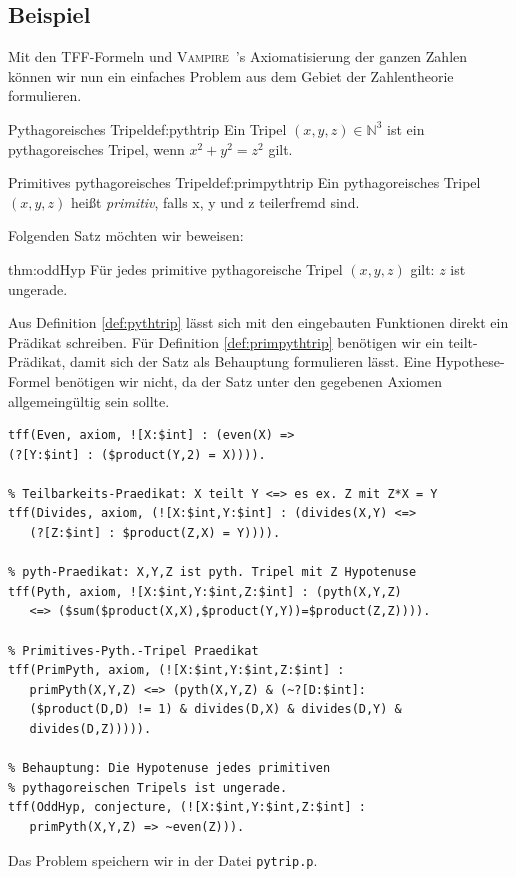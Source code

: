 \documentclass{article}
\newcommand{\vampire}{\textsc{Vampire}~}
\begin{document}
\fi %


\subsection{Beispiel}
\label{subsec:tptpexample}

Mit den TFF-Formeln und \vampire's Axiomatisierung der ganzen Zahlen können wir nun 
ein einfaches Problem aus dem Gebiet der Zahlentheorie formulieren.

\begin{definition}{Pythagoreisches Tripel}{def:pythtrip}
	Ein Tripel $(x, y, z) \in \mathds{N}^3$ ist ein pythagoreisches Tripel, wenn
	$x^2+y^2=z^2$ gilt.
\end{definition}
\begin{definition}{Primitives pythagoreisches Tripel}{def:primpythtrip}
	Ein pythagoreisches Tripel $(x, y, z)$ heißt \emph{primitiv}, falls x, y und z teilerfremd sind.
\end{definition}
Folgenden Satz möchten wir beweisen:
\begin{theorem}{}{thm:oddHyp}
	Für jedes primitive pythagoreische Tripel $(x, y, z)$ gilt: $z$ ist ungerade.
\end{theorem}
Aus Definition \ref{def:pythtrip} lässt sich mit den eingebauten Funktionen direkt ein Prädikat schreiben.
Für Definition \ref{def:primpythtrip} benötigen wir ein teilt-Prädikat, damit sich der Satz als Behauptung formulieren lässt. 
Eine Hypothese-Formel benötigen wir nicht, da der Satz unter den gegebenen Axiomen allgemeingültig sein sollte.
\begin{lstlisting}[language=tptp]
% even-Praedikat: X ist gerade
tff(Even, axiom, ![X:$int] : (even(X) =>
(?[Y:$int] : ($product(Y,2) = X)))).

% Teilbarkeits-Praedikat: X teilt Y <=> es ex. Z mit Z*X = Y
tff(Divides, axiom, (![X:$int,Y:$int] : (divides(X,Y) <=>
   (?[Z:$int] : $product(Z,X) = Y)))).

% pyth-Praedikat: X,Y,Z ist pyth. Tripel mit Z Hypotenuse
tff(Pyth, axiom, ![X:$int,Y:$int,Z:$int] : (pyth(X,Y,Z)
   <=> ($sum($product(X,X),$product(Y,Y))=$product(Z,Z)))).

% Primitives-Pyth.-Tripel Praedikat
tff(PrimPyth, axiom, (![X:$int,Y:$int,Z:$int] : 
   primPyth(X,Y,Z) <=> (pyth(X,Y,Z) & (~?[D:$int]: 
   ($product(D,D) != 1) & divides(D,X) & divides(D,Y) & 
   divides(D,Z))))).

% Behauptung: Die Hypotenuse jedes primitiven 
% pythagoreischen Tripels ist ungerade.
tff(OddHyp, conjecture, (![X:$int,Y:$int,Z:$int] : 
   primPyth(X,Y,Z) => ~even(Z))).
\end{lstlisting}
Das Problem speichern wir in der Datei \verb|pytrip.p|.
\end{document}
